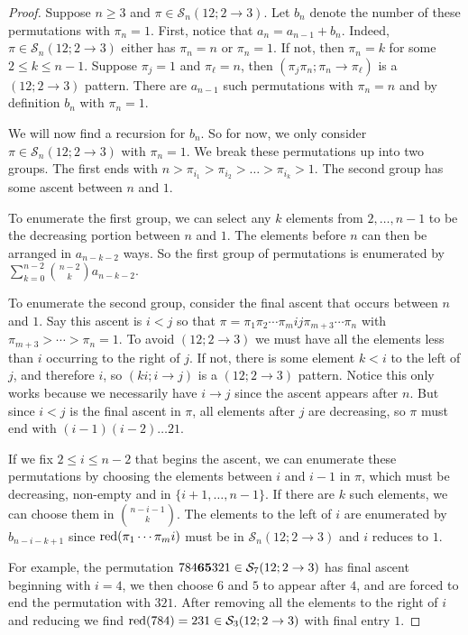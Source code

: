 \documentclass[11pt]{article}
\renewcommand\S{\mathcal S}
\theoremstyle{definition}
\begin{document}
\begin{proof}
    Suppose $n \geq 3$ and $\pi \in \S_n(12; 2 \to 3)$. Let $b_n$ denote the number of these permutations with $\pi_n = 1$. First, notice that $a_n = a_{n-1} + b_n$. Indeed, $\pi \in \S_n(12; 2 \to 3)$ either has $\pi_n = n$ or $\pi_n = 1$. If not, then $\pi_n = k$ for some $2 \leq k \leq n-1$. Suppose $\pi_j = 1$ and $\pi_\ell = n$, then $(\pi_j\pi_n;\pi_n \to \pi_\ell)$ is a $(12; 2 \to 3)$ pattern. There are $a_{n-1}$ such permutations with $\pi_n = n$ and by definition $b_n$ with $\pi_n = 1$.

    We will now find a recursion for $b_n$. So for now, we only consider $\pi \in \S_n(12;2\to3)$ with $\pi_n = 1$. We break these permutations up into two groups. The first ends with $n > \pi_{i_1} > \pi_{i_2}> \ldots > \pi_{i_k} > 1$. The second group has some ascent between $n$ and $1$. 

    To enumerate the first group, we can select any $k$ elements from $2,\dots,n-1$ to be the decreasing portion between $n$ and $1$. The elements before $n$ can then be arranged in $a_{n-k-2}$ ways. So the first group of permutations is enumerated by $\sum_{k=0}^{n-2} \binom{n-2}{k} a_{n-k-2}$.

    To enumerate the second group, consider the final ascent that occurs between $n$ and $1$. Say this ascent is $i < j$ so that $\pi = \pi_1 \pi_2 \cdots \pi_m ij \pi_{m+3} \cdots \pi_n$ with $\pi_{m+3} > \cdots > \pi_n = 1.$ To avoid $(12;2\to3)$ we must have all the elements less than $i$ occurring to the right of $j$. If not, there is some element $k < i$ to the left of $j$, and therefore $i$, so $(ki; i \to j)$ is a $(12; 2\to 3)$ pattern. Notice this only works because we necessarily have $i \to j$ since the ascent appears after $n$. But since $i < j$ is the final ascent in $\pi$, all elements after $j$ are decreasing, so $\pi$ must end with $(i-1)(i-2)\ldots21$.
    
    If we fix $2 \leq i \leq n-2$ that begins the ascent, we can enumerate these permutations by choosing the elements between $i$ and $i-1$ in $\pi$, which must be decreasing, non-empty and in $\{i+1,\dots,n-1\}$. If there are $k$ such elements, we can choose them in $\binom{n-i-1}{k}$. The elements to the left of $i$ are enumerated by $b_{n-i-k+1}$ since ${\rm red}(\pi_1 \cdots \pi_m i)$ must be in $\S_n(12; 2\to3)$ and  $i$ reduces to $1$.
    
    For example, the permutation $784{\bf 65} 321 \in \S_7(12; 2\to3)$ has final ascent beginning with $i = 4$, we then choose $6$ and $5$ to appear after $4$, and are forced to end the permutation with $321$. After removing all the elements to the right of $i$ and reducing we find ${\rm red}(784) = 231 \in \S_3(12; 2\to3)$ with final entry $1$.


\end{proof}
\end{document}
